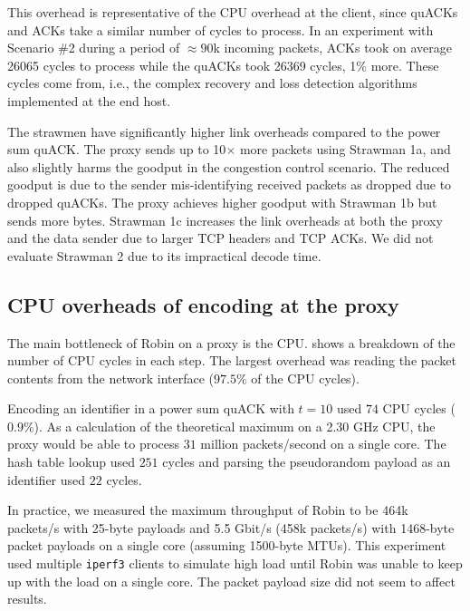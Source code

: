 This overhead is representative of the CPU overhead at the client, since
quACKs and ACKs take a similar number of cycles to process. In an experiment
with Scenario \#2 during a period of $\approx90$k incoming packets, ACKs took on
average 26065 cycles to process while the quACKs took 26369 cycles, 1\% more.
These cycles come from, i.e., the complex recovery and loss detection algorithms
implemented at the end host.

The strawmen have significantly higher link overheads compared to the power sum
quACK\@. The proxy sends up to 10$\times$ more packets using Strawman 1a, and
also slightly harms the goodput in the congestion control scenario.
The reduced goodput is due to the sender mis-identifying received packets as
dropped due to dropped quACKs.
The proxy achieves higher goodput with Strawman 1b but sends
more bytes. Strawman 1c increases the link overheads at both the proxy and the
data sender due to larger TCP headers and TCP ACKs.
We did not evaluate Strawman 2 due to its impractical decode time.

\subsection{CPU overheads of encoding at the proxy}
\label{sec:sidekick:emulation:cpu-overheads}



The main bottleneck of Robin on a proxy is the CPU\@.
 shows a breakdown of the number of CPU cycles in each
step. The largest overhead was reading the packet contents from the network
interface ($97.5\%$ of the CPU cycles).

Encoding an identifier in a power sum quACK with $t=10$ used $74$ CPU
cycles ($0.9\%$). As a calculation of the theoretical maximum on a 2.30 GHz
CPU, the proxy would be able to process $31$ million packets/second on a single
core. The hash table lookup used $251$ cycles and parsing the pseudorandom
payload as an identifier used $22$ cycles.

In practice, we measured the maximum throughput of Robin to
be 464k packets/s with 25-byte payloads and 5.5 Gbit/s (458k packets/s) with
1468-byte packet payloads on a single core (assuming 1500-byte MTUs).
This experiment used multiple \texttt{iperf3} clients to simulate high
load until Robin was unable to keep up with the load on a single core.
The packet payload size did not seem to affect results.

